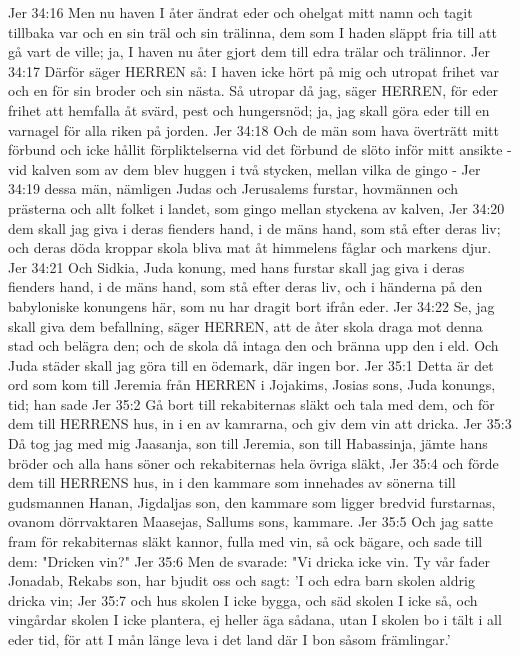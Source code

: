 Jer 34:16  Men nu haven I åter ändrat eder och ohelgat mitt namn och tagit tillbaka var och en sin träl och sin trälinna, dem som I haden släppt fria till att gå vart de ville; ja, I haven nu åter gjort dem till edra trälar och trälinnor.
Jer 34:17  Därför säger HERREN så: I haven icke hört på mig och utropat frihet var och en för sin broder och sin nästa. Så utropar då jag, säger HERREN, för eder frihet att hemfalla åt svärd, pest och hungersnöd; ja, jag skall göra eder till en varnagel för alla riken på jorden.
Jer 34:18  Och de män som hava överträtt mitt förbund och icke hållit förpliktelserna vid det förbund de slöto inför mitt ansikte - vid kalven som av dem blev huggen i två stycken, mellan vilka de gingo -
Jer 34:19  dessa män, nämligen Judas och Jerusalems furstar, hovmännen och prästerna och allt folket i landet, som gingo mellan styckena av kalven,
Jer 34:20  dem skall jag giva i deras fienders hand, i de mäns hand, som stå efter deras liv; och deras döda kroppar skola bliva mat åt himmelens fåglar och markens djur.
Jer 34:21  Och Sidkia, Juda konung, med hans furstar skall jag giva i deras fienders hand, i de mäns hand, som stå efter deras liv, och i händerna på den babyloniske konungens här, som nu har dragit bort ifrån eder.
Jer 34:22  Se, jag skall giva dem befallning, säger HERREN, att de åter skola draga mot denna stad och belägra den; och de skola då intaga den och bränna upp den i eld. Och Juda städer skall jag göra till en ödemark, där ingen bor.
Jer 35:1  Detta är det ord som kom till Jeremia från HERREN i Jojakims, Josias sons, Juda konungs, tid; han sade
Jer 35:2  Gå bort till rekabiternas släkt och tala med dem, och för dem till HERRENS hus, in i en av kamrarna, och giv dem vin att dricka.
Jer 35:3  Då tog jag med mig Jaasanja, son till Jeremia, son till Habassinja, jämte hans bröder och alla hans söner och rekabiternas hela övriga släkt,
Jer 35:4  och förde dem till HERRENS hus, in i den kammare som innehades av sönerna till gudsmannen Hanan, Jigdaljas son, den kammare som ligger bredvid furstarnas, ovanom dörrvaktaren Maasejas, Sallums sons, kammare.
Jer 35:5  Och jag satte fram för rekabiternas släkt kannor, fulla med vin, så ock bägare, och sade till dem: "Dricken vin?"
Jer 35:6  Men de svarade: "Vi dricka icke vin. Ty vår fader Jonadab, Rekabs son, har bjudit oss och sagt: 'I och edra barn skolen aldrig dricka vin;
Jer 35:7  och hus skolen I icke bygga, och säd skolen I icke så, och vingårdar skolen I icke plantera, ej heller äga sådana, utan I skolen bo i tält i all eder tid, för att I mån länge leva i det land där I bon såsom främlingar.'
